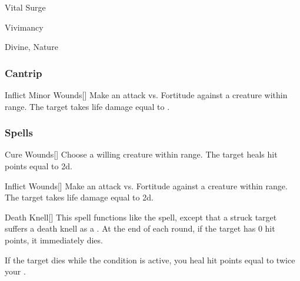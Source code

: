 \newpage
\begin{spellsection}{Vital Surge}

\begin{spellheader}
\end{spellheader}


 Vivimancy

 Divine, Nature

\subsubsection{Cantrip}


\begin{freeability}{Inflict Minor Wounds}[]
Make an attack vs. Fortitude against a creature within \rngmed range.
\hit The target takes life damage equal to .
\end{freeability}

\end{spellsection}


\subsubsection{Spells}


\lowercase{\hypertarget{spell:Cure Wounds}{}}\label{spell:Cure Wounds}
\begin{apability}[\nth{1}]{\hypertarget{spell:Cure Wounds}{Cure Wounds}}[]
Choose a willing creature within \rngmed range.
The target heals hit points equal to  \plus2d.
\end{apability}
\vspace{0.25em}



\lowercase{\hypertarget{spell:Inflict Wounds}{}}\label{spell:Inflict Wounds}
\begin{apability}[\nth{1}]{\hypertarget{spell:Inflict Wounds}{Inflict Wounds}}[]
Make an attack vs. Fortitude against a creature within \rngmed range.
\hit The target takes life damage equal to  \plus2d.
\end{apability}
\vspace{0.25em}



\lowercase{\hypertarget{spell:Death Knell}{}}\label{spell:Death Knell}
\begin{apability}[\nth{2}]{\hypertarget{spell:Death Knell}{Death Knell}}[]
This spell functions like the  spell, except that a struck target suffers a death knell as a .
At the end of each round, if the target has 0 hit points, it immediately dies.

If the target dies while the condition is active, you heal hit points equal to twice your .
\end{apability}
\vspace{0.25em}



